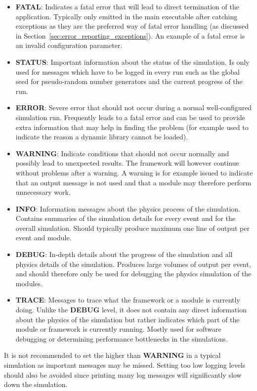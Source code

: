 \begin{itemize}
\item \textbf{FATAL}: Indicates a fatal error that will lead to direct termination of the application.
Typically only emitted in the main executable after catching exceptions as they are the preferred way of fatal error handling (as discussed in Section~\ref{sec:error_reporting_exceptions}).
An example of a fatal error is an invalid configuration parameter.
\item \textbf{STATUS}: Important information about the status of the simulation.
Is only used for messages which have to be logged in every run such as the global seed for pseudo-random number generators and the current progress of the run.
\item \textbf{ERROR}: Severe error that should not occur during a normal well-configured simulation run.
Frequently leads to a fatal error and can be used to provide extra information that may help in finding the problem (for example used to indicate the reason a dynamic library cannot be loaded).
\item \textbf{WARNING}: Indicate conditions that should not occur normally and possibly lead to unexpected results.
The framework will however continue without problems after a warning.
A warning is for example issued to indicate that an output message is not used and that a module may therefore perform unnecessary work.
\item \textbf{INFO}: Information messages about the physics process of the simulation.
Contains summaries of the simulation details for every event and for the overall simulation.
Should typically produce maximum one line of output per event and module.
\item \textbf{DEBUG}: In-depth details about the progress of the simulation and all physics details of the simulation.
Produces large volumes of output per event, and should therefore only be used for  debugging the physics simulation of the modules.
\item \textbf{TRACE}: Messages to trace what the framework or a module is currently doing.
Unlike the \textbf{DEBUG} level, it does not contain any direct information about the physics of the simulation but rather indicates which part of the module or framework is currently running.
Mostly used for software debugging or determining performance bottlenecks in the simulations.
\end{itemize}

\begin{warning}
    It is not recommended to set the  higher than \textbf{WARNING} in a typical simulation as important messages may be missed.
    Setting too low logging levels should also be avoided since printing many log messages will significantly slow down the simulation.
\end{warning}

